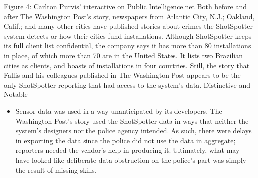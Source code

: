Figure 4: Carlton Purvis' interactive on Public Intelligence.net
Both before and after The Washington Post's story, newspapers from Atlantic
City, N.J.; Oakland, Calif.; and many other cities have published stories
about crimes the ShotSpotter system detects or how their cities fund installations.
Although ShotSpotter keeps its full client list confidential, the company
says it has more than 80 installations in place, of which more than 70
are in the United States. It lists two Brazilian cities as clients, and boasts of
installations in four countries. Still, the story that Fallis and his colleagues
published in The Washington Post appears to be the only ShotSpotter reporting
that had access to the system's data.
Distinctive and Notable
\begin{itemize}
\item Sensor data was used in a way unanticipated by its developers.
The Washington Post's story used the ShotSpotter data in ways that
neither the system's designers nor the police agency intended. As such,
there were delays in exporting the data since the police did not use the
data in aggregate; reporters needed the vendor's help in producing it.
Ultimately, what may have looked like deliberate data obstruction on
the police's part was simply the result of missing skills.


\end{itemize}
